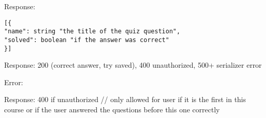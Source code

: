 Response:

\begin{verbatim}
[{
"name": string "the title of the quiz question",
"solved": boolean "if the answer was correct"
}]
\end{verbatim}

Response: 200 (correct answer, try saved), 400 unauthorized, 500+
serializer error

Error:

Response: 400 if unauthorized // only allowed for user if it is the
first in this course or if the user answered the questions before this one
correctly

